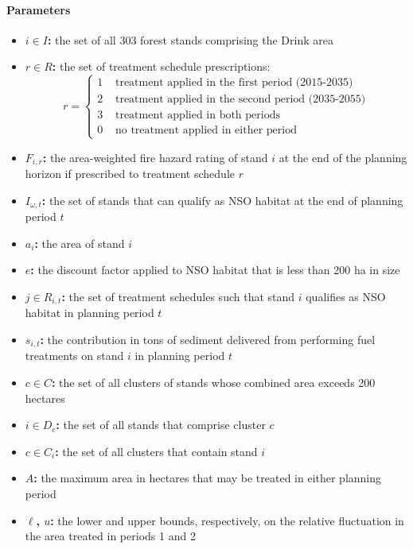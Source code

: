 \paragraph{Parameters}
\begin{itemize}
\item \textbf{$i \in I$:} the set of all 303 forest stands comprising the Drink area
\item \textbf{$r \in R$:} the set of treatment schedule prescriptions:
	$$
	r =
	\begin{cases}
	1 &\text{ treatment applied in the first period (2015-2035)}\\
	2 &\text{ treatment applied in the second period (2035-2055)}\\
	3 &\text{ treatment applied in both periods}\\
	0 &\text{ no treatment applied in either period}
	\end{cases}
	$$
\item \textbf{$F_{i,r}$:} the area-weighted fire hazard rating of stand $i$ at the end of the planning horizon if prescribed to treatment schedule $r$
\item \textbf{$I_{\omega,t}$:} the set of stands that can qualify as NSO habitat at the end of planning period $t$
\item \textbf{$a_i$:} the area of stand $i$
\item \textbf{$e$:} the discount factor applied to NSO habitat that is less than 200 ha in size
\item \textbf{$j \in R_{i,t}$:} the set of treatment schedules such that stand $i$ qualifies as NSO habitat in planning period $t$
\item \textbf{$s_{i,t}$:} the contribution in tons of sediment delivered from performing fuel treatments on stand $i$ in planning period $t$
\item \textbf{$c \in C$:} the set of all clusters of stands whose combined area exceeds 200 hectares
\item \textbf{$i \in D_c$:} the set of all stands that comprise cluster $c$
\item \textbf{$c \in C_i$:} the set of all clusters that contain stand $i$
\item \textbf{$A$:} the maximum area in hectares that may be treated in either planning period
\item \textbf{$\ell$, $u$:} the lower and upper bounds, respectively, on the relative fluctuation in the area treated in periods 1 and 2
\end{itemize}

